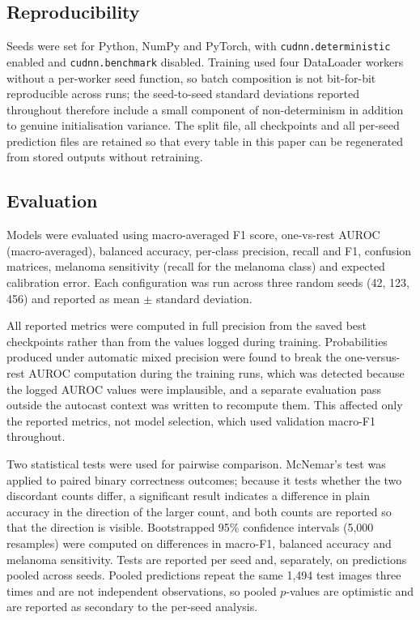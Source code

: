 \documentclass[conference]{IEEEtran}
\begin{document}
\subsection{Reproducibility}

Seeds were set for Python, NumPy and PyTorch, with \texttt{cudnn.deterministic} enabled and \texttt{cudnn.benchmark} disabled. Training used four DataLoader workers without a per-worker seed function, so batch composition is not bit-for-bit reproducible across runs; the seed-to-seed standard deviations reported throughout therefore include a small component of non-determinism in addition to genuine initialisation variance. The split file, all checkpoints and all per-seed prediction files are retained so that every table in this paper can be regenerated from stored outputs without retraining.

\subsection{Evaluation}

Models were evaluated using macro-averaged F1 score, one-vs-rest AUROC (macro-averaged), balanced accuracy, per-class precision, recall and F1, confusion matrices, melanoma sensitivity (recall for the melanoma class) and expected calibration error. Each configuration was run across three random seeds (42, 123, 456) and reported as mean $\pm$ standard deviation.

All reported metrics were computed in full precision from the saved best checkpoints rather than from the values logged during training. Probabilities produced under automatic mixed precision were found to break the one-versus-rest AUROC computation during the training runs, which was detected because the logged AUROC values were implausible, and a separate evaluation pass outside the autocast context was written to recompute them. This affected only the reported metrics, not model selection, which used validation macro-F1 throughout.

Two statistical tests were used for pairwise comparison. McNemar's test was applied to paired binary correctness outcomes; because it tests whether the two discordant counts differ, a significant result indicates a difference in plain accuracy in the direction of the larger count, and both counts are reported so that the direction is visible. Bootstrapped 95\% confidence intervals (5,000 resamples) were computed on differences in macro-F1, balanced accuracy and melanoma sensitivity. Tests are reported per seed and, separately, on predictions pooled across seeds. Pooled predictions repeat the same 1,494 test images three times and are not independent observations, so pooled $p$-values are optimistic and are reported as secondary to the per-seed analysis.
\end{document}
